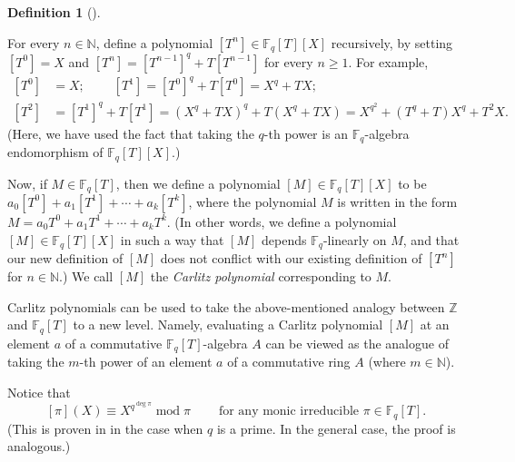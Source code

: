 \documentclass[numbers=enddot,12pt,final,onecolumn,notitlepage]{scrartcl}%
\theoremstyle{definition}
\newtheorem{defi}[theo]{Definition}
\newenvironment{definition}[1][]
{\begin{defi}[#1]\begin{leftbar}}
{\end{leftbar}\end{defi}}
\begin{document}
\begin{definition}
\label{def.carlitzpoly}For every $n\in\mathbb{N}$, define a polynomial
$\left[  T^{n}\right]  \in\mathbb{F}_{q}\left[  T\right]  \left[  X\right]  $
recursively, by setting $\left[  T^{0}\right]  =X$ and $\left[  T^{n}\right]
=\left[  T^{n-1}\right]  ^{q}+T\left[  T^{n-1}\right]  $ for every $n\geq1$.
For example,%
\begin{align*}
\left[  T^{0}\right]   &  =X;\ \ \ \ \ \ \ \ \ \ \left[  T^{1}\right]
=\left[  T^{0}\right]  ^{q}+T\left[  T^{0}\right]  =X^{q}+TX;\\
\left[  T^{2}\right]   &  =\left[  T^{1}\right]  ^{q}+T\left[  T^{1}\right]
=\left(  X^{q}+TX\right)  ^{q}+T\left(  X^{q}+TX\right)  =X^{q^{2}}+\left(
T^{q}+T\right)  X^{q}+T^{2}X.
\end{align*}
(Here, we have used the fact that taking the $q$-th power is an $\mathbb{F}%
_{q}$-algebra endomorphism of $\mathbb{F}_{q}\left[  T\right]  \left[
X\right]  $.)

Now, if $M\in\mathbb{F}_{q}\left[  T\right]  $, then we define a polynomial
$\left[  M\right]  \in\mathbb{F}_{q}\left[  T\right]  \left[  X\right]  $ to
be $a_{0}\left[  T^{0}\right]  +a_{1}\left[  T^{1}\right]  +\cdots
+a_{k}\left[  T^{k}\right]  $, where the polynomial $M$ is written in the form
$M=a_{0}T^{0}+a_{1}T^{1}+\cdots+a_{k}T^{k}$. (In other words, we define a
polynomial $\left[  M\right]  \in\mathbb{F}_{q}\left[  T\right]  \left[
X\right]  $ in such a way that $\left[  M\right]  $ depends $\mathbb{F}_{q}%
$-linearly on $M$, and that our new definition of $\left[  M\right]  $ does
not conflict with our existing definition of $\left[  T^{n}\right]  $ for
$n\in\mathbb{N}$.) We call $\left[  M\right]  $ the \textit{Carlitz
polynomial} corresponding to $M$.
\end{definition}

Carlitz polynomials can be used to take the above-mentioned analogy between
$\mathbb{Z}$ and $\mathbb{F}_{q}\left[  T\right]  $ to a new level. Namely,
evaluating a Carlitz polynomial $\left[  M\right]  $ at an element $a$ of a
commutative $\mathbb{F}_{q}\left[  T\right]  $-algebra $A$ can be viewed as
the analogue of taking the $m$-th power of an element $a$ of a commutative
ring $A$ (where $m\in\mathbb{N}$).

Notice that%
\begin{equation}
\left[  \pi\right]  \left(  X\right)  \equiv X^{q^{\deg\pi}}\operatorname{mod}%
\pi\ \ \ \ \ \ \ \ \ \ \text{for any monic irreducible }\pi\in\mathbb{F}%
_{q}\left[  T\right]  . \label{carlitz-piX}%
\end{equation}
(This is proven in \cite[Theorem 2.11]{kc-carlitz} in the case when $q$ is a
prime. In the general case, the proof is analogous.)
\end{document}
